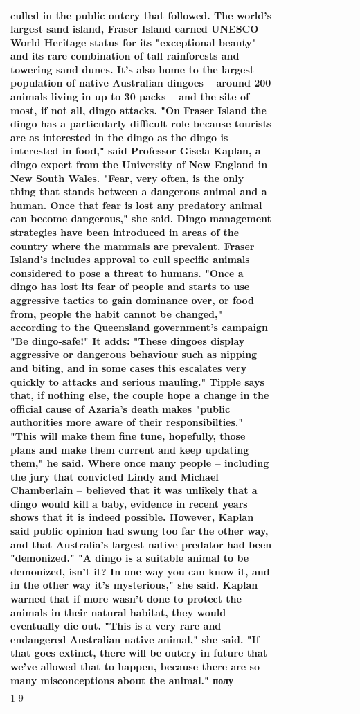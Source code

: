 \begin{table}[H]
\begin{tabular}{lllrlllll}
culled in the public outcry that followed. The world's largest sand island, Fraser Island earned UNESCO World Heritage status for its "exceptional beauty" and its rare combination of tall rainforests and towering sand dunes. It's also home to the largest population of native Australian dingoes -- around 200 animals living in up to 30 packs -- and the site of most, if not all, dingo attacks. "On Fraser Island the dingo has a particularly difficult role because tourists are as interested in the dingo as the dingo is interested in food," said Professor Gisela Kaplan, a dingo expert from the University of New England in New South Wales. "Fear, very often, is the only thing that stands between a dangerous animal and a human. Once that fear is lost any predatory animal can become dangerous," she said. Dingo management strategies have been introduced in areas of the country where the mammals are prevalent. Fraser Island's includes approval to cull specific animals considered to pose a threat to humans. "Once a dingo has lost its fear of people and starts to use aggressive tactics to gain dominance over, or food from, people the habit cannot be changed," according to the Queensland government's campaign "Be dingo-safe!" It adds: "These dingoes display aggressive or dangerous behaviour such as nipping and biting, and in some cases this escalates very quickly to attacks and serious mauling." Tipple says that, if nothing else, the couple hope a change in the official cause of Azaria's death makes "public authorities more aware of their responsibilties." "This will make them fine tune, hopefully, those plans and make them current and keep updating them," he said. Where once many people -- including the jury that convicted Lindy and Michael Chamberlain -- believed that it was unlikely that a dingo would kill a baby, evidence in recent years shows that it is indeed possible. However, Kaplan said public opinion had swung too far the other way, and that Australia's largest native predator had been "demonized." "A dingo is a suitable animal to be demonized, isn't it? In one way you can know it, and in the other way it's mysterious," she said. Kaplan warned that if more wasn't done to protect the animals in their natural habitat, they would eventually die out. "This is a very rare and endangered Australian native animal," she said. "If that goes extinct, there will be outcry in future that we've allowed that to happen, because there are so many misconceptions about the animal." полу \\
\cline{1-9}

\end{tabular}
\end{table}
